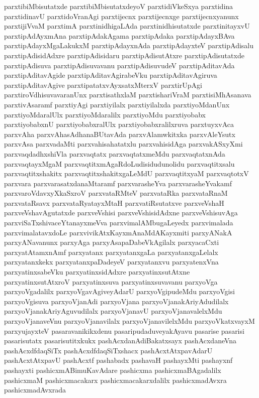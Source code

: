 {parxtibiMbisutatxde
parxtibiMbisutatxdeyoV
parxtidiVkeSxya
parxtidina
parxtidinavU
parxtidoVranAgi
parxtijecnx
parxtijecnxge
parxtijecnxyanunx
parxtijiVvaM
parxtimA
parxtinidhigaLAda
parxtinidhisutatxde
parxtinitayxvU
parxtipAdAyxmAna
parxtipAdakAgama
parxtipAdaka
parxtipAdayxBAva
parxtipAdayxMgaLakukxM
parxtipAdayxnAda
parxtipAdayxteV
parxtipAdisalu
parxtipAdisidAdxre
parxtipAdisidaru
parxtipAdisutAtxre
parxtipAdisutatxde
parxtipAdisuva
parxtipAdisuvavanu
parxtipAdisuvudeV
parxtipAditavAda
parxtipAditavAgide
parxtipAditavAgirabeVku
parxtipAditavAgiruva
parxtipAditavAgive
parxtipatatxvAyxsatxMterxV
parxtirUpAgi
parxtiroVdhisuvavaranUnx
parxtisathxlaM
parxtishariVraM
parxtisiMhAsanava
parxtivAsaramf
parxtiyAgi
parxtiyilalx
parxtiyilalxda
parxtiyoMdanUnx
parxtiyoMdaralUlx
parxtiyoMdaralilx
parxtiyoMdu
parxtiyobabx
parxtiyobabxnU
parxtiyobabxralUlx
parxtiyobabxralilxruva
parxtuyxvAca
parxvAha
parxvAhasAdhanaBUtavAda
parxvAlamwkitxka
parxvAleYsutx
parxvAsa
parxvadaMti
parxvahisahatatxlu
parxvahisidAga
parxvakASxyXmi
parxvaqdadhxshiVla
parxvaqtatx
parxvaqtatxmeMdu
parxvaqtatxnAda
parxvaqtayxMgaM
parxvaqtitxmAgaRdoLudisidudunolidu
parxvaqtitxsalu
parxvaqtitxshakitx
parxvaqtitxshakitxgaLeMdU
parxvaqtitxyaM
parxvaqtotxV
parxvara
parxvarasatxdanaMtaramf
parxvarasheYva
parxvarasheYvakamf
parxvaroVdavxyXkaSxroV
parxvataRMteV
parxvataRka
parxvataRnaM
parxvataRsavx
parxvataRyatayxMtaH
parxvatiRsutatxve
parxveVshaH
parxveVshavAgutatxde
parxveVshisi
parxveVshisidAdxne
parxveVshisuvAga
parxviSaTxshivaceYtanayxmeVva
parxvimalAMbugaLeyedx
parxvimalada
parxvimalatavxdoLe
parxvivikAtxKayxmAnaMdAKayxmiti
parxyANakA
parxyANavanunx
parxyAga
parxyAsapaDabeVkAgilalx
parxyacaCxti
parxyatAtamxnAmf
parxyatanx
parxyatanxgaLa
parxyatanxgaLelalx
parxyatanxkekx
parxyatanxpaDadeyeV
parxyatanxvu
parxyatenxVna
parxyatinxsabeVku
parxyatinxsidAdxre
parxyatinxsutAtxne
parxyatinxsutAtxroV
parxyatinxsuva
parxyatinxsuvavanu
parxyoVga
parxyoVgadalilx
parxyoVgavAgiveyAdarU
parxyoVgipudeMdu
parxyoVgisi
parxyoVgisuva
parxyoVjanAdi
parxyoVjana
parxyoVjanakAriyAdudilalx
parxyoVjanakAriyAguvudilalx
parxyoVjanavU
parxyoVjanavalelxMdu
parxyoVjanaveVnu
parxyoVjanavilalx
parxyoVjanavilelxMdu
parxyoVkatxvayxM
parxyujayxteV
pasaravanikikxdenu
pasaripudaduveyakAyavu
pasarise
pasarisi
pasarisutatx
pasarisutitxkukx
pashAcxdanAdiBakatxsayx
pashAcxdaneVna
pashAcxdfdaqSiTx
pashAcxdfdaqSiTxshacx
pashAcxtAtxpavAdarU
pashAcxtAtxpavU
pashAcxtf
pashabadx
pashavaH
pashayxMti
pashayxnf
pashayxti
pashicxmABimuKavAdare
pashicxma
pashicxmaBAgadalilx
pashicxmaM
pashicxmacakarx
pashicxmacakarxdalilx
pashicxmadAvxra
pashicxmadAvxrada
}
